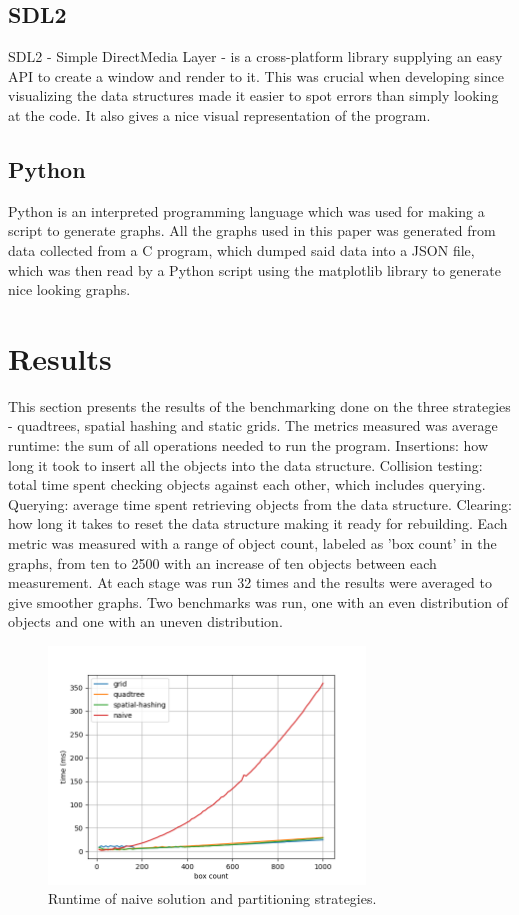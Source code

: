 \documentclass[a4paper, 12pt]{article}
\begin{document}
\subsection{SDL2}
SDL2 - Simple DirectMedia Layer - is a cross-platform library supplying an easy
API to create a window and render to it. This was crucial when developing since
visualizing the data structures made it easier to spot errors than simply
looking at the code. It also gives a nice visual representation of the program.

\subsection{Python}
Python is an interpreted programming language which was used for making a script
to generate graphs. All the graphs used in this paper was generated from data
collected from a C program, which dumped said data into a JSON file, which was
then read by a Python script using the matplotlib library to generate nice
looking graphs.

\newpage

\section{Results}
This section presents the results of the benchmarking done on the three
strategies - quadtrees, spatial hashing and static grids. The metrics measured
was average runtime: the sum of all operations needed to run the program.
Insertions: how long it took to insert all the objects into the data structure.
Collision testing: total time spent checking objects against each other, which
includes querying. Querying: average time spent retrieving objects from the data
structure. Clearing: how long it takes to reset the data structure making it
ready for rebuilding. Each metric was measured with a range of object count,
labeled as 'box count' in the graphs, from ten to 2500 with an increase of ten
objects between each measurement. At each stage was run 32 times and the results
were averaged to give smoother graphs. Two benchmarks was run, one with an even
distribution of objects and one with an uneven distribution.

\begin{figure}[h]
    \centering
    \includegraphics[width=0.75\textwidth]{even-naive.png}
    \caption{Runtime of naive solution and partitioning strategies.}
    \label{fig:naive}
\end{figure}
\end{document}
